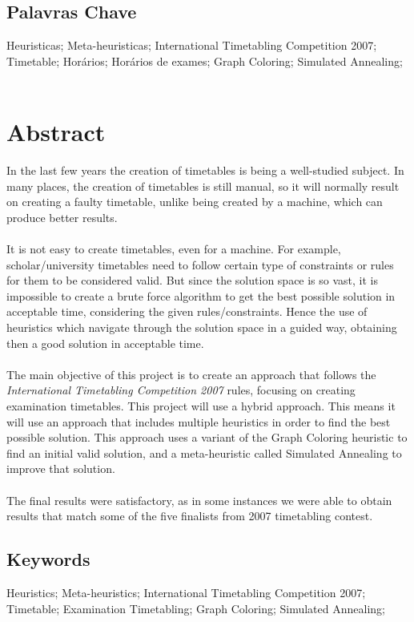 \section*{Palavras Chave}

Heuristicas; Meta-heuristicas; International Timetabling Competition 2007; Timetable; Horários; Horários de exames; Graph Coloring; Simulated Annealing;
\

\chapter*{Abstract}

In the last few years the creation of timetables is being a well-studied subject. In many places, the creation of timetables is still manual, so it will normally result on creating a faulty timetable, unlike being created by a machine, which can produce better results.\\
\\
It is not easy to create timetables, even for a machine. For example, scholar/university timetables need to follow certain type of constraints or rules for them to be considered valid. But since the solution space is so vast, it is impossible to create a brute force algorithm to get the best possible solution in acceptable time, considering the given rules/constraints. Hence the use of heuristics which navigate through the solution space in a guided way, obtaining then a good solution in acceptable time.\\
\\
The main objective of this project is to create an approach that follows the \textit{International Timetabling Competition 2007} rules, focusing on creating examination timetables. This project will use a hybrid approach. This means it will use an approach that includes multiple heuristics in order to find the best possible solution. This approach uses a variant of the Graph Coloring heuristic to find an initial valid solution, and a meta-heuristic called Simulated Annealing to improve that solution.\\
\\
The final results were satisfactory, as in some instances we were able to obtain results that match some of the five finalists from 2007 timetabling contest.


\section*{Keywords}

Heuristics; Meta-heuristics; International Timetabling Competition 2007; Timetable; Examination Timetabling; Graph Coloring; Simulated Annealing;

